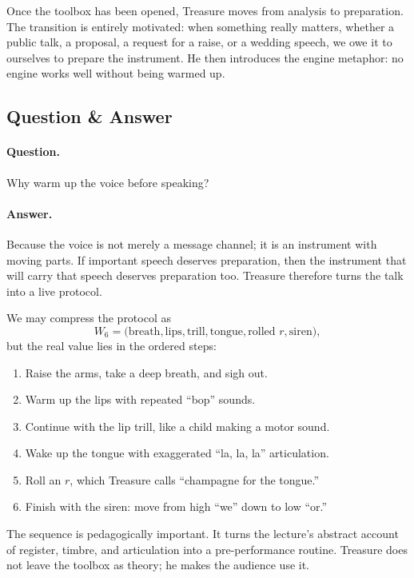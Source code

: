Once the toolbox has been opened, Treasure moves from analysis to preparation. The transition is entirely motivated: when something really matters, whether a public talk, a proposal, a request for a raise, or a wedding speech, we owe it to ourselves to prepare the instrument. He then introduces the engine metaphor: no engine works well without being warmed up.

\subsection{Question \& Answer}

\paragraph{Question.} Why warm up the voice before speaking?

\paragraph{Answer.} Because the voice is not merely a message channel; it is an instrument with moving parts. If important speech deserves preparation, then the instrument that will carry that speech deserves preparation too. Treasure therefore turns the talk into a live protocol.

We may compress the protocol as
\begin{equation}
W_6=
\bigl(
\text{breath},
\text{lips},
\text{trill},
\text{tongue},
\text{rolled } r,
\text{siren}
\bigr),
\end{equation}
but the real value lies in the ordered steps:

\begin{enumerate}
\item Raise the arms, take a deep breath, and sigh out.
\item Warm up the lips with repeated ``bop'' sounds.
\item Continue with the lip trill, like a child making a motor sound.
\item Wake up the tongue with exaggerated ``la, la, la'' articulation.
\item Roll an \(r\), which Treasure calls ``champagne for the tongue.''
\item Finish with the siren: move from high ``we'' down to low ``or.''
\end{enumerate}

The sequence is pedagogically important. It turns the lecture's abstract account of register, timbre, and articulation into a pre-performance routine. Treasure does not leave the toolbox as theory; he makes the audience use it.

